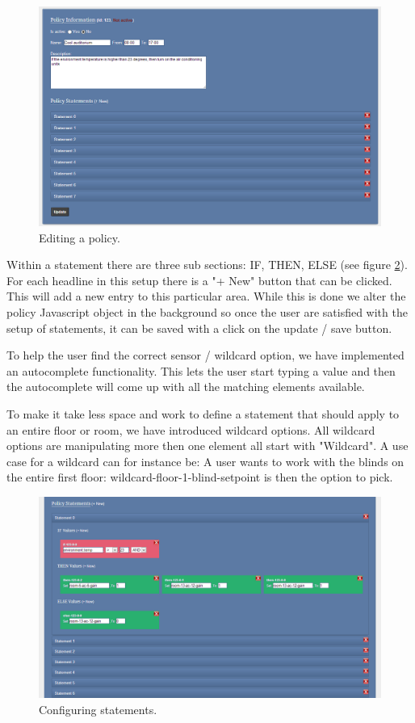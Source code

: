 \begin{figure}[ht]
\centering
\includegraphics[width=\columnwidth]{policy.png}
\caption{Editing a policy.}
\label{fig:policy}
\end{figure}

Within a statement there are three sub sections: IF, THEN, ELSE (see figure \ref{fig:statement}). For each headline in this setup there is a "+ New" button that can be clicked. This will add a new entry to this particular area. While this is done we alter the policy Javascript object in the background so once the user are satisfied with the setup of statements, it can be saved with a click on the update / save button.

To help the user find the correct sensor / wildcard option, we have implemented an autocomplete functionality. This lets the user start typing a value and then the autocomplete will come up with all the matching elements available.

To make it take less space and work to define a statement that should apply to an entire floor or room, we have introduced wildcard options. All wildcard options are manipulating more then one element all start with "Wildcard". A use case for a wildcard can for instance be: A user wants to work with the blinds on the entire first floor: wildcard-floor-1-blind-setpoint is then the option to pick.

\begin{figure}[ht]
\centering
\includegraphics[width=\columnwidth]{statement.png}
\caption{Configuring statements.}
\label{fig:statement}
\end{figure}


